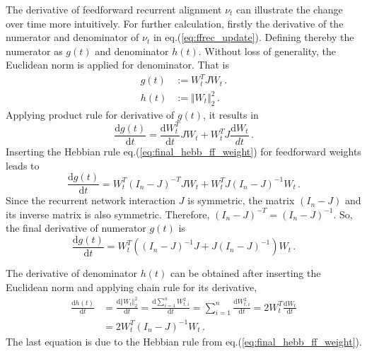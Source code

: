 \documentclass[11pt]{article}
\begin{document}
{	The derivative of feedforward recurrent alignment $\nu_t$ can illustrate the change over time more intuitively. For further calculation, firstly the derivative of the numerator and denominator of $\nu_t$ in eq.(\ref{eq:ffrec_update}). Defining thereby the numerator as $g(t)$ and denominator $h(t)$. Without loss of generality, the Euclidean norm is applied for denominator. That is
		\begin{subequations}
			\begin{align} 
				g(t) &:= W_t^T J W_t \, .\\ 
				h(t) &:= \Vert W_t \Vert_2^2 \, .
			\end{align}
		\end{subequations}
	Applying product rule for derivative of $g(t)$, it results in
		\begin{equation}
				\frac{\mathrm{d}g(t)}{\mathrm{d}t} = \frac{\mathrm{d}W_t^T}{\mathrm{d}t} J W_t + W_t^T J \frac{\mathrm{d}W_t}{dt} \, .
		\end{equation}
	Inserting the Hebbian rule eq.(\ref{eq:final_hebb_ff_weight}) for feedforward weights leads to
		\begin{equation}
			\frac{\mathrm{d}g(t)}{\mathrm{d}t} = W_t^T (I_n - J)^{-T}J W_t + W_t^T J(I_n - J)^{-1} W_t \, .
		\end{equation}
	Since the recurrent network interaction $J$ is symmetric, the matrix $(I_n-J)$ and its inverse matrix is also symmetric. Therefore, $(I_n - J)^{-T} = (I_n - J)^{-1}$. So, the final derivative of numerator $g(t)$ is
		\begin{equation}
			\frac{\mathrm{d}g(t)}{\mathrm{d}t} = W_t^T \left( (I_n - J)^{-1}J + J(I_n - J)^{-1}\right)W_t \, .
		\end{equation}
	
	The derivative of denominator $h(t)$ can be obtained after inserting the Euclidean norm and applying chain rule for its derivative,  
		\begin{equation}
			\begin{split}
				\frac{\mathrm{d}h(t)}{\mathrm{d}t} & = \frac{\mathrm{d} \Vert W_t \Vert_2^2}{\mathrm{d}t} = \frac{\mathrm{d} \sum_{i=1}^{n} W_{t, i}^2}{\mathrm{d}t}
				= \sum_{i=1}^{n} \frac{\mathrm{d}W_{t,i}^2}{\mathrm{d}t} = 2W_t^T \frac{\mathrm{d}W_t}{\mathrm{d}t} \\
				& = 2W_t^T (I_n - J)^{-1} W_t \,.
			\end{split}
		\end{equation}
	The last equation is due to the Hebbian rule from eq.(\ref{eq:final_hebb_ff_weight}). 
	
}
\end{document}
